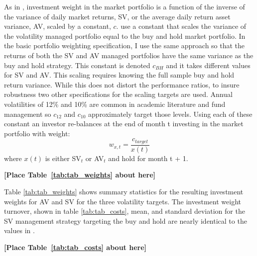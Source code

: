As in \citet{moreira_volatility-managed_2017}, investment weight in the market portfolio is a function of the inverse of the variance of daily market returns, SV, or the average daily return asset variance, AV, scaled by a constant, $c$. \citet{moreira_volatility-managed_2017} use a constant that scales the variance of the volatility managed portfolio equal to the buy and hold market portfolio. In the basic portfolio weighting specification, I use the same approach so that the returns of both the SV and AV managed portfolios have the same variance as the buy and hold strategy. This constant is denoted $c_{BH}$ and it takes different values for SV and AV. This scaling requires knowing the full sample buy and hold return variance. While this does not distort the performance ratios, to insure robustness two other specifications for the scaling targets are used. Annual volatilities of 12\% and 10\% are common in academic literature and fund management so $c_{12}$ and $c_{10}$ approximately target those levels. \citep{barroso_momentum_2015,morrison_guarantees_nodate,verma_volatility-targeting_2018,fleming_economic_nodate,hocquard_constant-volatility_2013} Using each of these constant an investor re-balances at the end of month t investing in the market portfolio with weight:
\begin{equation}
	w_{x,t} = \frac{c_{target}}{x(t)}
\end{equation} where $x(t)$ is either SV$_{t}$ or AV$_{t}$ and hold for month t + 1. 

\bigskip
\centerline{\bf [Place Table~\ref{tab:tab_weights} about here]}
\bigskip
Table \ref{tab:tab_weights} shows summary statistics for the resulting investment weights for AV and SV for the three volatility targets. The investment weight turnover, shown in table \ref{tab:tab_costs}, mean, and standard deviation for the SV management strategy targeting the buy and hold are nearly identical to the values in \citet{moreira_volatility-managed_2017}. 

\bigskip
\centerline{\bf [Place Table~\ref{tab:tab_costs} about here]}
\bigskip
